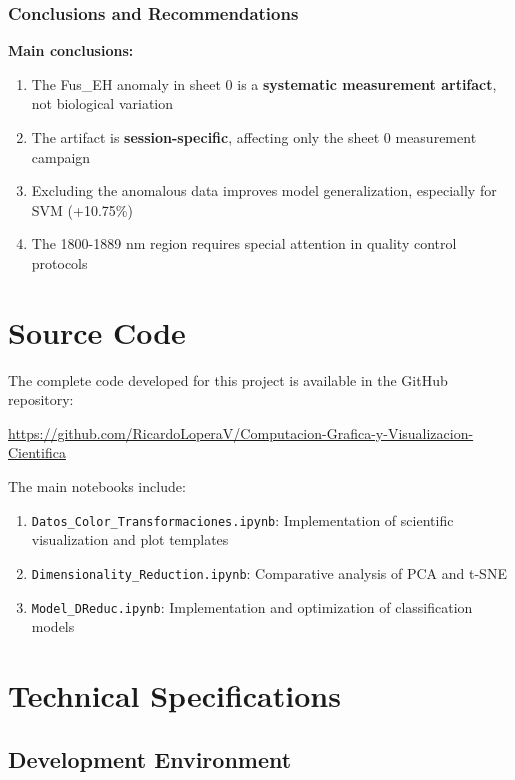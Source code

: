 \documentclass[12pt,a4paper]{article}
\begin{document}
\subsubsection{Conclusions and Recommendations}

\textbf{Main conclusions:}
\begin{enumerate}
    \item The Fus\_EH anomaly in sheet 0 is a \textbf{systematic measurement artifact}, not biological variation
    \item The artifact is \textbf{session-specific}, affecting only the sheet 0 measurement campaign
    \item Excluding the anomalous data improves model generalization, especially for SVM (+10.75\%)
    \item The 1800-1889 nm region requires special attention in quality control protocols
\end{enumerate}


\newpage
\appendix
\section{Source Code}

The complete code developed for this project is available in the GitHub repository:

\begin{center}
\url{https://github.com/RicardoLoperaV/Computacion-Grafica-y-Visualizacion-Cientifica}
\end{center}

The main notebooks include:

\begin{enumerate}
    \item \texttt{Datos\_Color\_Transformaciones.ipynb}: Implementation of scientific visualization and plot templates
    \item \texttt{Dimensionality\_Reduction.ipynb}: Comparative analysis of PCA and t-SNE
    \item \texttt{Model\_DReduc.ipynb}: Implementation and optimization of classification models
\end{enumerate}

\section{Technical Specifications}

\subsection{Development Environment}
\end{document}
